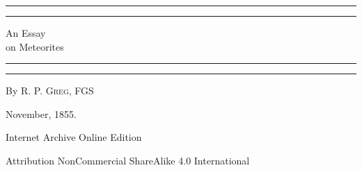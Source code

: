 \documentclass[a4paper, 12pt, oneside]{article}
\begin{document}
\begin{titlepage} %
	\centering %
	\scshape %

	
	\rule{\textwidth}{1.6pt}\vspace*{-\baselineskip}\vspace*{2pt} %
	\rule{\textwidth}{0.4pt} %
	
	\vspace{0.75\baselineskip} %

        {\Huge An Essay \\ on Meteorites \\} %
	
	\vspace{0.75\baselineskip} %
	
	\rule{\textwidth}{0.4pt}\vspace*{-\baselineskip}\vspace{3.2pt} %
	\rule{\textwidth}{1.6pt} %
	
	\vspace{1\baselineskip} %
	
	
	{By \scshape\Large R. P. Greg, FGS \\} %
	
	\vspace*{1\baselineskip} %
	

	\vspace{1\baselineskip} %

	
	
		
	\vspace*{\fill}%
	
	November, 1855.%
	
	\vspace{1\baselineskip} %

        Internet Archive Online Edition  %
	
	{\small Attribution NonCommercial ShareAlike 4.0 International } %
\end{titlepage}
\end{document}

